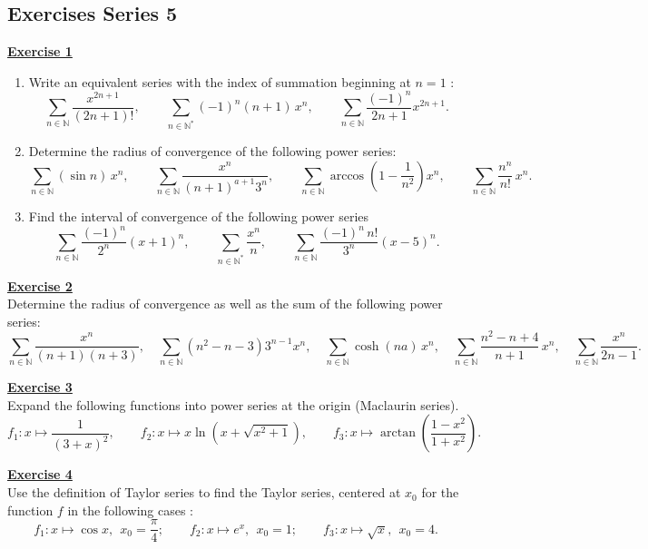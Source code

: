 \subsection{Exercises Series 5}
\vspace*{0.2cm}
\noindent\Large{\underline{\textbf{Exercise 1}}}
\normalsize{}
\begin{enumerate}
    \item Write an equivalent series with the index of summation beginning at $n = 1$ :
    $$  \sum_{n \in \mathbb{N}} \dfrac{x^{2n+1}}{(2n+1)!}, \qquad \sum_{n \in \mathbb{N}^*} (-1)^n (n+1)\, x^n, \qquad 
        \sum_{n \in \mathbb{N}} \dfrac{(-1)^n}{2n+1} x^{2n+1}.  $$
    \item Determine the radius of convergence of the following power series:
    $$  \sum_{n \in \mathbb{N}} (\sin n)\, x^n, \qquad \sum_{n \in \mathbb{N}} \dfrac{x^n}{(n+1)^{a+1} 3^n}, \qquad 
        \sum_{n \in \mathbb{N}} \arccos\!\left(1 - \dfrac{1}{n^2}\right)x^n, \qquad 
        \sum_{n \in \mathbb{N}} \dfrac{n^n}{n!}\, x^n. $$
    \item Find the interval of convergence of the following power series
    $$  \sum_{n \in \mathbb{N}} \dfrac{(-1)^n}{2^n} (x+1)^n, \qquad 
        \sum_{n \in \mathbb{N}^*} \dfrac{x^n}{n}, \qquad \sum_{n \in \mathbb{N}} \dfrac{(-1)^n\, n!}{3^n} (x-5)^n. $$
\end{enumerate}

\noindent\Large{\underline{\textbf{Exercise 2}}}
\normalsize{}\\
\noindent Determine the radius of convergence as well as the sum of the following power series:
    $$ \sum_{n \in \mathbb{N}} \dfrac{x^n}{(n+1)(n+3)}, \quad 
       \sum_{n \in \mathbb{N}} \left(n^2 - n - 3\right) 3^{n-1} x^n, \quad 
       \sum_{n \in \mathbb{N}} \cosh(na)\, x^n, \quad 
       \sum_{n \in \mathbb{N}} \dfrac{n^2 - n + 4}{n+1}\, x^n, 
       \quad \sum_{n \in \mathbb{N}} \dfrac{x^n}{2n-1}. $$

\noindent\Large{\underline{\textbf{Exercise 3}}}
\normalsize{}\\
\noindent Expand the following functions into power series at the origin (Maclaurin series).
    $$ f_1 : x \longmapsto \dfrac{1}{(3+x)^2}, \qquad 
       f_2 : x \longmapsto x\ln\!\left(x + \sqrt{x^2+1}\right), \qquad 
       f_3 : x \longmapsto \arctan\!\left(\dfrac{1-x^2}{1+x^2}\right). $$

\noindent\Large{\underline{\textbf{Exercise 4}}}
\normalsize{}\\
\noindent Use the definition of Taylor series to find the Taylor series, 
centered at $x_0$ for the function $f$ in the following cases :
    $$  f_1 : x \longmapsto \cos x,\ \ x_0 = \dfrac{\pi}{4}; \qquad 
        f_2 : x \longmapsto e^x,\ \ x_0 = 1; \qquad 
        f_3 : x \longmapsto \sqrt{x},\ \ x_0 = 4.   $$

